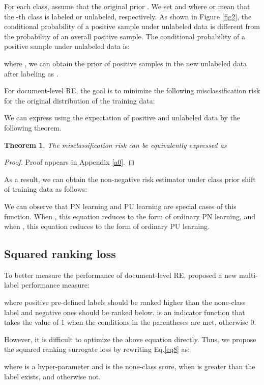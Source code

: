 \documentclass[11pt]{article}
\begin{document}
For each class, assume that the original prior . We set  and  where  or  mean that the -th class is labeled or unlabeled, respectively. As shown in Figure \ref{fig2}, the conditional probability of a positive sample under unlabeled data is different from the probability of an overall positive sample. The conditional probability of a positive sample under unlabeled data is:

where , we can obtain the prior of positive samples in the new unlabeled data after labeling as . 

For document-level RE, the goal is to minimize the following misclassification risk for the original distribution of the training data:


We can express  using the expectation of positive and unlabeled data by the following theorem.
\newtheorem{thm}{\bf Theorem}
\begin{thm}\label{thm1}
The misclassification risk  can be equivalently expressed as

\end{thm} 
\begin{proof}
Proof appears in Appendix \ref{a0}.
\end{proof}

As a result, we can obtain the non-negative risk estimator \citep{NIPS2017_7cce53cf} under class prior shift of training data as follows:


We can observe that PN learning and PU learning are special cases of this function. When , this equation reduces to the form of ordinary PN learning, and when , this equation reduces to the form of ordinary PU learning.

\subsection{Squared ranking loss}

To better measure the performance of document-level RE, \citep{ijcai2022p630} proposed a new multi-label performance measure:

where positive pre-defined labels should be ranked higher than the none-class label and negative ones should be ranked below.  is an indicator function that takes the value of 1 when the conditions in the parentheses are met, otherwise 0.

However, it is difficult to optimize the above equation directly. Thus, we propose the squared ranking surrogate loss by rewriting Eq.\ref{eq8} as:

where  is a hyper-parameter and  is the none-class score, when  is greater than  the label exists, and otherwise not.
\end{document}
